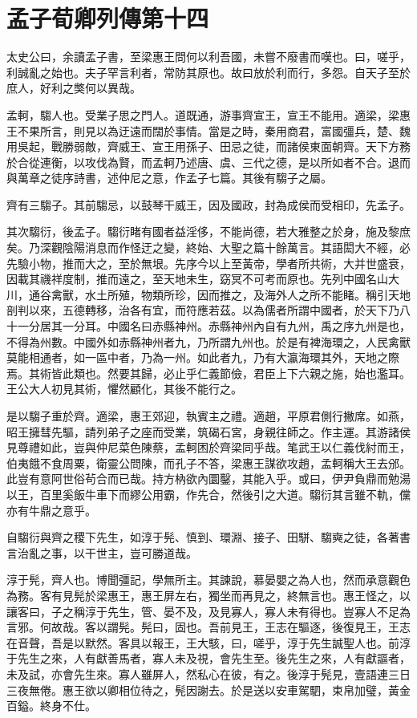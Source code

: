 \chapter{孟子荀卿列傳第十四}

太史公曰，余讀孟子書，至梁惠王問何以利吾國，未嘗不廢書而嘆也。曰，嗟乎，利誠亂之始也。夫子罕言利者，常防其原也。故曰放於利而行，多怨。自天子至於庶人，好利之獘何以異哉。

孟軻，騶人也。受業子思之門人。道既通，游事齊宣王，宣王不能用。適梁，梁惠王不果所言，則見以為迂遠而闊於事情。當是之時，秦用商君，富國彊兵，楚、魏用吳起，戰勝弱敵，齊威王、宣王用孫子、田忌之徒，而諸侯東面朝齊。天下方務於合從連衡，以攻伐為賢，而孟軻乃述唐、虞、三代之德，是以所如者不合。退而與萬章之徒序詩書，述仲尼之意，作孟子七篇。其後有騶子之屬。

齊有三騶子。其前騶忌，以鼓琴干威王，因及國政，封為成侯而受相印，先孟子。

其次騶衍，後孟子。騶衍睹有國者益淫侈，不能尚德，若大雅整之於身，施及黎庶矣。乃深觀陰陽消息而作怪迂之變，終始、大聖之篇十餘萬言。其語閎大不經，必先驗小物，推而大之，至於無垠。先序今以上至黃帝，學者所共術，大并世盛衰，因載其禨祥度制，推而遠之，至天地未生，窈冥不可考而原也。先列中國名山大川，通谷禽獸，水土所殖，物類所珍，因而推之，及海外人之所不能睹。稱引天地剖判以來，五德轉移，治各有宜，而符應若茲。以為儒者所謂中國者，於天下乃八十一分居其一分耳。中國名曰赤縣神州。赤縣神州內自有九州，禹之序九州是也，不得為州數。中國外如赤縣神州者九，乃所謂九州也。於是有裨海環之，人民禽獸莫能相通者，如一區中者，乃為一州。如此者九，乃有大瀛海環其外，天地之際焉。其術皆此類也。然要其歸，必止乎仁義節儉，君臣上下六親之施，始也濫耳。王公大人初見其術，懼然顧化，其後不能行之。

是以騶子重於齊。適梁，惠王郊迎，執賓主之禮。適趙，平原君側行撇席。如燕，昭王擁彗先驅，請列弟子之座而受業，筑碣石宮，身親往師之。作主運。其游諸侯見尊禮如此，豈與仲尼菜色陳蔡，孟軻困於齊梁同乎哉。笔武王以仁義伐紂而王，伯夷餓不食周粟，衛靈公問陳，而孔子不答，梁惠王謀欲攻趙，孟軻稱大王去邠。此豈有意阿世俗茍合而已哉。持方枘欲內圜鑿，其能入乎。或曰，伊尹負鼎而勉湯以王，百里奚飯牛車下而繆公用霸，作先合，然後引之大道。騶衍其言雖不軌，儻亦有牛鼎之意乎。

自騶衍與齊之稷下先生，如淳于髡、慎到、環淵、接子、田駢、騶奭之徒，各著書言治亂之事，以干世主，豈可勝道哉。

淳于髡，齊人也。博聞彊記，學無所主。其諫說，慕晏嬰之為人也，然而承意觀色為務。客有見髡於梁惠王，惠王屏左右，獨坐而再見之，終無言也。惠王怪之，以讓客曰，子之稱淳于先生，管、晏不及，及見寡人，寡人未有得也。豈寡人不足為言邪。何故哉。客以謂髡。髡曰，固也。吾前見王，王志在驅逐，後復見王，王志在音聲，吾是以默然。客具以報王，王大駭，曰，嗟乎，淳于先生誠聖人也。前淳于先生之來，人有獻善馬者，寡人未及視，會先生至。後先生之來，人有獻謳者，未及試，亦會先生來。寡人雖屏人，然私心在彼，有之。後淳于髡見，壹語連三日三夜無倦。惠王欲以卿相位待之，髡因謝去。於是送以安車駕駟，束帛加璧，黃金百鎰。終身不仕。

